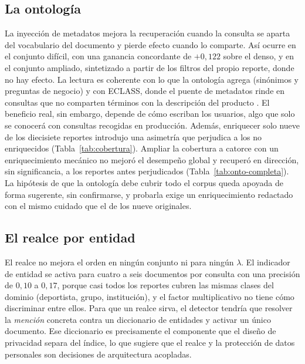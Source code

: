 \documentclass[11pt,letterpaper]{article}
\numberwithin{equation}{section}
\begin{document}
\subsection*{La ontología}
La inyección de metadatos mejora la recuperación cuando la consulta se aparta del vocabulario del documento y pierde efecto cuando lo comparte. Así ocurre en el conjunto difícil, con una ganancia concordante de $+0{,}122$ sobre el denso, y en el conjunto ampliado, sintetizado a partir de los filtros del propio reporte, donde no hay efecto. La lectura es coherente con lo que la ontología agrega (sinónimos y preguntas de negocio) y con ECLASS, donde el puente de metadatos rinde en consultas que no comparten términos con la descripción del producto \cite{baumgart2026eclass}. El beneficio real, sin embargo, depende de cómo escriban los usuarios, algo que solo se conocerá con consultas recogidas en producción. Además, enriquecer solo nueve de los diecisiete reportes introdujo una asimetría que perjudica a los no enriquecidos (Tabla~\ref{tab:cobertura}). Ampliar la cobertura a catorce con un enriquecimiento mecánico no mejoró el desempeño global y recuperó en dirección, sin significancia, a los reportes antes perjudicados (Tabla~\ref{tab:onto-completa}). La hipótesis de que la ontología debe cubrir todo el corpus queda apoyada de forma sugerente, sin confirmarse, y probarla exige un enriquecimiento redactado con el mismo cuidado que el de los nueve originales.

\subsection*{El realce por entidad}
El realce no mejora el orden en ningún conjunto ni para ningún $\lambda$. El indicador de entidad se activa para cuatro a seis documentos por consulta con una precisión de $0{,}10$ a $0{,}17$, porque casi todos los reportes cubren las mismas clases del dominio (deportista, grupo, institución), y el factor multiplicativo no tiene cómo discriminar entre ellos. Para que un realce sirva, el detector tendría que resolver la \emph{mención} concreta contra un diccionario de entidades y activar un único documento. Ese diccionario es precisamente el componente que el diseño de privacidad separa del índice, lo que sugiere que el realce y la protección de datos personales son decisiones de arquitectura acopladas.
\end{document}
